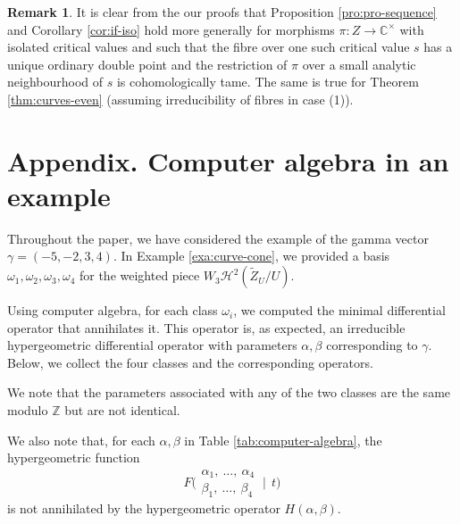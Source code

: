 \documentclass[11pt, reqno]{amsart}
\theoremstyle{plain}
\theoremstyle{definition}
\newtheorem{rem}[thm]{Remark}
\newcommand{\CC}{\mathbb{C}}
\newcommand{\Z}{\mathbb{Z}}
\begin{document}
\begin{rem}
\label{rem:more-generality}
    It is clear from the our proofs that Proposition \ref{pro:pro-sequence} and Corollary \ref{cor:if-iso} hold more generally for morphisms $\pi \colon Z \to \CC^\times$ with isolated critical values and such that the fibre over one such critical value $s$ has a unique ordinary double point and the restriction of $\pi$ over a small analytic neighbourhood of $s$ is cohomologically tame. 
    The same is true for Theorem \ref{thm:curves-even} (assuming irreducibility of fibres in case (1)). 
\end{rem}

\section*{Appendix.  Computer algebra in an example}


Throughout the paper, we have considered the example of the gamma vector $\gamma=(-5,-2,3,4)$. In Example \ref{exa:curve-cone}, we provided a basis $\omega_1, \omega_2, \omega_3, \omega_4$ for the weighted piece $W_3\mathcal{H}^2(\widetilde{Z}_U/U)$. 

Using computer algebra, for each class $\omega_i$, we computed the minimal differential operator that annihilates it. This operator is, as expected, an irreducible hypergeometric differential operator with parameters $\alpha, \beta$ corresponding to $\gamma$.
Below, we collect the four classes and the corresponding operators.

We note that the parameters associated with any of the two classes are the same modulo $\Z$ but are not identical.

We also note that, for each $\alpha,\beta$ in Table \ref{tab:computer-algebra},  the hypergeometric function 
\[
F\biggl(\begin{matrix} \alpha_1, \ \ldots, \ \alpha_4 \\ \beta_1, \ \ldots, \ \beta_4 \end{matrix} \:\bigg|\:\: t \biggr)
\] is not annihilated by the hypergeometric operator $H(\alpha, \beta)$. 
\end{document}

